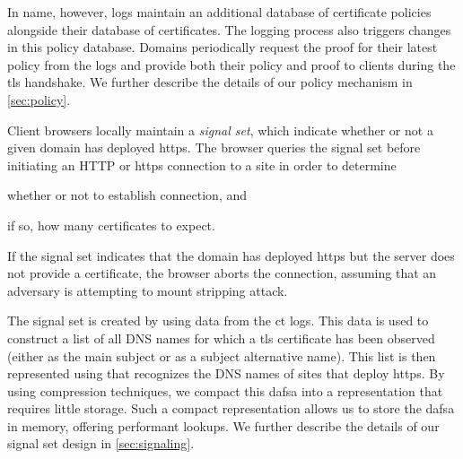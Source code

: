 In \ac{name}, however, logs maintain an additional database of certificate
policies alongside their database of certificates. The logging process also
triggers changes in this policy database. Domains periodically request the proof
for their latest policy from the logs and provide both their policy and proof to
clients during the \ac{tls} handshake. We further describe the details of our
policy mechanism in \autoref{sec:policy}.

Client browsers locally maintain a \emph{signal set}, which indicate whether or
not a given domain has deployed \ac{https}. The browser queries the signal set
before initiating an HTTP or \ac{https} connection to a site 
in order to determine
\begin{inparaenum}
\item whether or not to establish  connection, and
\item if so, how many certificates to expect.
\end{inparaenum}
If the signal set indicates that the domain has deployed \ac{https} but the
server does not provide a certificate, the browser aborts the connection,
assuming that an adversary is attempting to mount  stripping attack.

The signal set is created by using data from the \ac{ct} logs. This data is used
to construct a list of all DNS names for which a \ac{tls} certificate has been
observed (either as the main subject or as a subject alternative name). This
list is then represented using  that recognizes the DNS names of
sites that deploy \ac{https}. By using compression techniques, we compact this
\ac{dafsa} into a representation that requires little storage. Such a compact
representation allows us to store the \ac{dafsa} in memory, offering performant
lookups. We further describe the details of our signal set design in
\autoref{sec:signaling}.


